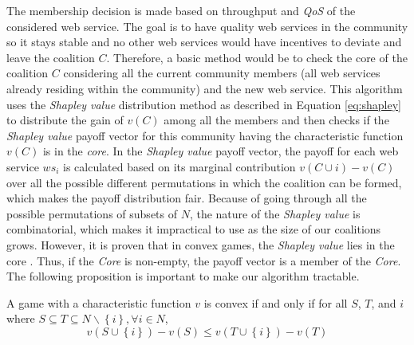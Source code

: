 The membership decision is made based on throughput and \emph{QoS}
of the considered web service. The goal is to have quality web
services in the community so it stays stable and no other web
services would have incentives to deviate and leave the coalition
$C$. Therefore, a basic method would be to check the core of the
coalition $C$ considering all the current community members (all
web services already residing within the community) and the new
web service. This algorithm uses the \emph{Shapley value}
distribution method as described in Equation \ref{eq:shapley} to
distribute the gain of $v(C)$ among all the members and then
checks if the \emph{Shapley value} payoff vector for this
community having the characteristic function $v(C)$ is in the
\emph{core}. In the \emph{Shapley value} payoff vector, the payoff
for each web service $ws_i$ is calculated based on its marginal
contribution $v(C \cup {i}) - v(C)$ over all the possible
different permutations in which the coalition can be formed, which
makes the payoff distribution fair. Because of going through all
the possible permutations of subsets of $N$, the nature of the
\emph{Shapley value} is combinatorial, which makes it impractical
to use as the size of our coalitions grows. However, it is proven
that in convex games, the \emph{Shapley value} lies in the core
\cite{DBLP:conf/ijcai/GrecoMPS11, myerson1991game}. Thus, if the
\emph{Core} is non-empty, the payoff vector is a member of the
\emph{Core}. The following proposition is important to make our
algorithm tractable.


\begin{theorem}\label{proposition1}
A game with a characteristic function $v$
is convex if and only if for all $S$, $T$, and $i$ where $S
\subseteq T \subseteq N \backslash \left\{i\right\}, \forall i \in
N$,
\begin{equation}\label{eq:convex_snow}
v(S \cup \left\{i\right\}) - v(S) \leq v (T \cup \left\{i\right\}) - v(T)
\end{equation}
\end{theorem}


